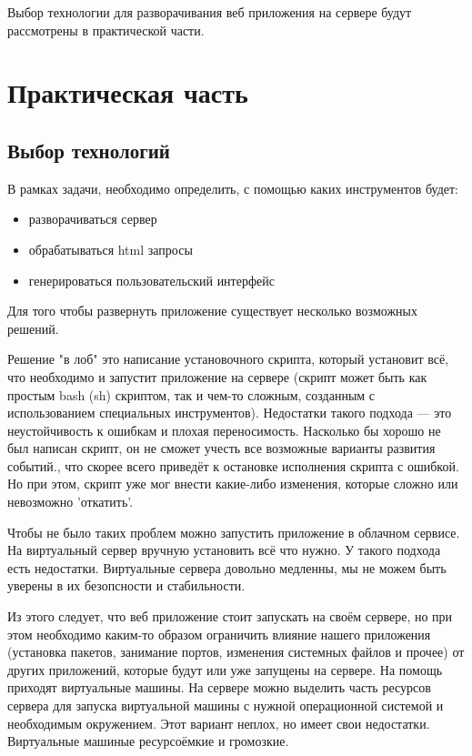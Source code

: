 \documentclass[14pt,a4paper]{scrartcl}
\begin{document}
    Выбор технологии для разворачивания веб приложения на сервере будут рассмотрены в практической части.

    \newpage
    \section[Практическая часть]{Практическая часть}
    \subsection[Выбор технологий]{Выбор технологий}
    В рамках задачи, необходимо определить, с помощью каких инструментов будет:
    \begin{itemize}
        \item разворачиваться сервер
        \item обрабатываться html запросы
        \item генерироваться пользовательский интерфейс
    \end{itemize}

    Для того чтобы развернуть приложение существует несколько возможных решений.

    Решение "в лоб" это написание установочного скрипта, который установит всё, что необходимо и запустит приложение на сервере (скрипт может быть как простым bash (sh) скриптом, так и чем-то сложным, созданным с использованием специальных инструментов). Недостатки такого подхода — это неустойчивость к ошибкам и плохая переносимость. Насколько бы хорошо не был написан скрипт, он не сможет учесть все возможные варианты развития событий., что скорее всего приведёт к остановке исполнения скрипта с ошибкой. Но при этом, скрипт уже мог внести какие-либо изменения, которые сложно или невозможно 'откатить'.

    Чтобы не было таких проблем можно запустить приложение в облачном сервисе. На виртуальный сервер вручную установить всё что нужно. У такого подхода есть недостатки. Виртуальные сервера довольно медленны, мы не можем быть уверены в их безопсности и стабильности.

    Из этого следует, что веб приложение стоит запускать на своём сервере, но при этом необходимо каким-то образом ограничить влияние нашего приложения (установка пакетов, занимание портов, изменения системных файлов и прочее) от других приложений, которые будут или уже запущены на сервере. На помощь приходят виртуальные машины. На сервере можно выделить часть ресурсов сервера для запуска виртуальной машины с нужной операционной системой и необходимым окружением. Этот вариант неплох, но имеет свои недостатки. Виртуальные машиные ресурсоёмкие и громозкие.
\end{document}

